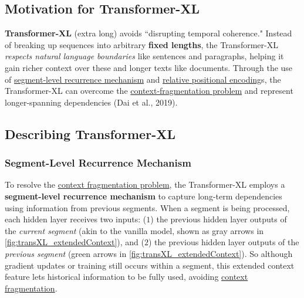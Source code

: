\subsection{Motivation for Transformer-XL} \label{sec:MotivationForTransformerXL}

\textbf{Transformer-XL} (extra long) avoids ``disrupting temporal coherence." Instead of breaking up sequences into arbitrary \textbf{fixed lengths}, the Transformer-XL \emph{respects natural language boundaries} like sentences and paragraphs, helping it gain richer context over these and longer texts like documents. Through the use of \hyperref[sec:SegmentLevelRec]{segment-level recurrence mechanism} and \hyperref[sec:RelativePosEnc]{relative positional encoding}s, the Transformer-XL can overcome the \hyperref[sec:ContextFragmentationProblem]{context-fragmentation problem} and represent longer-spanning dependencies (Dai et al., 2019). 


\subsection{Describing Transformer-XL} \label{sec:DescribingTransformerXL}

\subsubsection{Segment-Level Recurrence Mechanism} \label{sec:SegmentLevelRec}

To resolve the \hyperref[sec:ContextFragmentationProblem]{context fragmentation problem}, the Transformer-XL employs a \textbf{segment-level recurrence mechanism} to capture long-term dependencies using information from previous segments. When a segment is being processed, each hidden layer receives two inputs: ($1$) the previous hidden layer outputs of the \emph{current segment} (akin to the vanilla model, shown as gray arrows in \cref{fig:transXL_extendedContext}), and ($2$) the previous hidden layer outputs of the \emph{previous segment} (green arrows in \cref{fig:transXL_extendedContext}). So although gradient updates or training still occurs within a segment, this extended context feature lets historical information to be fully used, avoiding \hyperref[sec:ContextFragmentationProblem]{context fragmentation}. 


